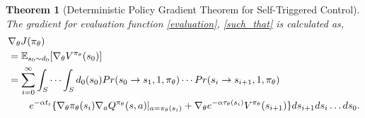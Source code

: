 \documentclass[english, dvipdfmx]{ampmt}             %
\newcommand{\expect}{\mathbb{E}}
\newtheorem{th.}{Theorem}
\begin{document}
\begin{th.}[Deterministic Policy Gradient Theorem for Self-Triggered Control]
The gradient for evaluation function \eqref{evaluation}, \eqref{such_that} is calculated as, 
\begin{align}
	&\nabla_{\theta}J(\pi_{\theta})\nonumber \\
	&= \expect_{s_0\sim d_0}[\nabla_{\theta}V^{\pi_{\theta}}(s_0)]\nonumber\\
	&= \sum_{i=0}^{\infty}\int_{S}\cdots\int_{S}d_0(s_0)Pr(s_0\to s_1,1,\pi_{\theta})\cdots Pr(s_{i}\to s_{i+1},1,\pi_{\theta})\nonumber\\
	&\hspace{5ex}e^{-\alpha t_i}\{\nabla_{\theta}\pi_{\theta}(s_i)\nabla_aQ^{\pi_{\theta}}(s,a)|_{a=\pi_{\theta}(s_i)} + \nabla_{\theta}e^{-\alpha\tau_{\theta}(s_{i})}V^{\pi_{\theta}}(s_{i+1})\}ds_{i+1}ds_{i}\ldots ds_0. \label{PG_for_STC}
\end{align}
\end{th.}
\end{document}
